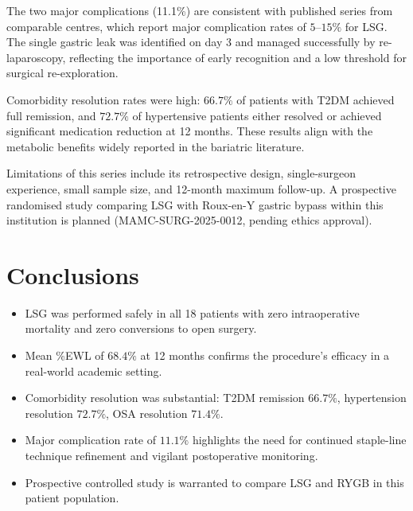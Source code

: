 \documentclass[11pt,a4paper]{article}
\begin{document}
The two major complications (11.1\%) are consistent with published series from
comparable centres, which report major complication rates of $5$--$15\%$ for LSG.
The single gastric leak was identified on day 3 and managed successfully by
re-laparoscopy, reflecting the importance of early recognition and a low threshold
for surgical re-exploration.

Comorbidity resolution rates were high: $66.7\%$ of patients with T2DM achieved full
remission, and $72.7\%$ of hypertensive patients either resolved or achieved significant
medication reduction at 12 months. These results align with the metabolic benefits
widely reported in the bariatric literature.

Limitations of this series include its retrospective design, single-surgeon experience,
small sample size, and 12-month maximum follow-up. A prospective randomised study
comparing LSG with Roux-en-Y gastric bypass within this institution is planned
(MAMC-SURG-2025-0012, pending ethics approval).

\section{Conclusions}

\begin{tcolorbox}[tealbox]
\begin{itemize}[leftmargin=16pt, itemsep=3pt, topsep=2pt]
  \item[\textcolor{SurgTeal}{\faCheckCircle}]
    LSG was performed safely in all 18 patients with zero intraoperative mortality
    and zero conversions to open surgery.
  \item[\textcolor{SurgTeal}{\faCheckCircle}]
    Mean \%EWL of $68.4\%$ at 12 months confirms the procedure's efficacy in
    a real-world academic setting.
  \item[\textcolor{SurgTeal}{\faCheckCircle}]
    Comorbidity resolution was substantial: T2DM remission $66.7\%$, hypertension
    resolution $72.7\%$, OSA resolution $71.4\%$.
  \item[\textcolor{SurgGold}{\faExclamationCircle}]
    Major complication rate of $11.1\%$ highlights the need for continued
    staple-line technique refinement and vigilant postoperative monitoring.
  \item[\textcolor{SurgBlue}{\faArrowCircleRight}]
    Prospective controlled study is warranted to compare LSG and RYGB in
    this patient population.
\end{itemize}
\end{tcolorbox}
\end{document}
